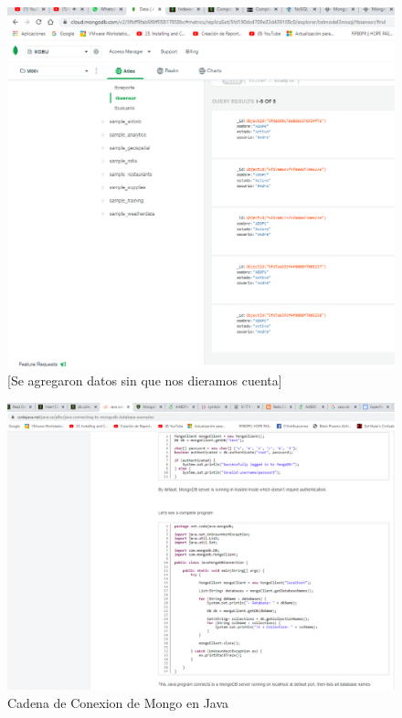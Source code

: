 \documentclass[twoside,twocolumn]{article}
\begin{document}
\begin{itemize}
\begin{figure}[h!]
\centering
\includegraphics[scale=0.25]{Image/insert,sin que nos demos cuenta.PNG}
\caption{[Se agregaron datos sin que nos dieramos cuenta]}
\label{fig:Csha3}
\end{figure}

\begin{figure}[h!]
\centering
\includegraphics[scale=0.20]{Image/String.PNG}
\caption{Cadena de Conexion de Mongo en Java}
\label{fig:Csha3}
\end{figure}


\end{itemize}
\end{document}
